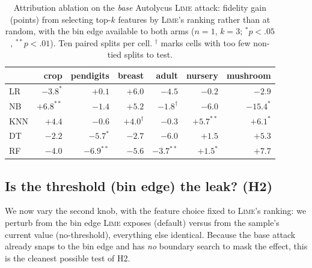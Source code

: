 \documentclass[sigconf,anonymous,review]{acmart}
\begin{document}
\begin{table}[t]
\centering
\caption{Attribution ablation on the \emph{base} Autolycus \textsc{Lime} attack: fidelity gain (points) from selecting top-$k$
features by \textsc{Lime}'s ranking rather than at random, with the bin edge available to both arms
($n{=}1$, $k{=}3$; $^{*}p{<}.05$, $^{**}p{<}.01$). Ten paired splits per cell. $^{\dag}$ marks cells
with too few non-tied splits to test.}
\label{tab:lime-attr}
\setlength{\tabcolsep}{3pt}
\begin{tabular}{lrrrrrr}
\toprule
 & crop & pendigits & breast & adult & nursery & mushroom \\
\midrule
LR  & $-3.8^{*}$  & $+0.1$        & $+6.0$        & $-4.5$        & $-0.2$       & $-2.9$ \\
NB  & $+6.8^{**}$ & $-1.4$        & $+5.2$        & $-1.8^{\dag}$ & $-6.0$       & $-15.4^{*}$ \\
KNN & $+4.4$      & $-0.6$        & $+4.0^{\dag}$ & $-0.3$        & $+5.7^{**}$  & $+6.1^{*}$ \\
DT  & $-2.2$      & $-5.7^{*}$    & $-2.7$        & $-6.0$        & $+1.5$       & $+5.3$ \\
RF  & $-4.0$      & $-6.9^{**}$   & $-5.6$        & $-3.7^{**}$   & $+1.5^{*}$   & $+7.7$ \\
\bottomrule
\end{tabular}
\end{table}

\subsection{Is the threshold (bin edge) the leak? (H2)}
\label{subsec:e3}
We now vary the second knob, with the feature
choice fixed to \textsc{Lime}'s ranking: we perturb from the bin edge \textsc{Lime} exposes (default)
versus from the sample's current value (no-threshold), everything else identical. Because the base
attack already snaps to the bin edge and has \emph{no} boundary search to mask the effect, this is
the cleanest possible test of H2.
\end{document}
